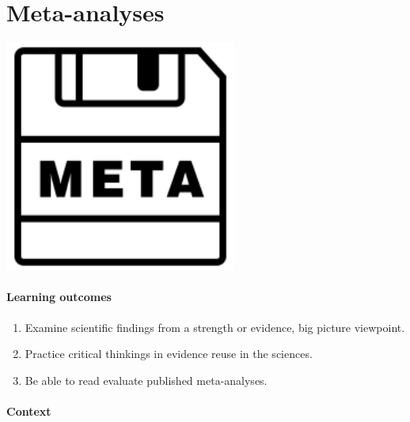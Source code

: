 \documentclass[
]{book}
\providecommand{\tightlist}{%
  \setlength{\itemsep}{0pt}\setlength{\parskip}{0pt}}
\begin{document}
\hypertarget{metas}{%
\chapter{Meta-analyses}\label{metas}}

\includegraphics[width=3in,height=\textheight]{./meta.png}

\hypertarget{learning-outcomes-8}{%
\subsubsection*{Learning outcomes}\label{learning-outcomes-8}}

\begin{enumerate}
\def\labelenumi{\arabic{enumi}.}
\tightlist
\item
  Examine scientific findings from a strength or evidence, big picture viewpoint.
\item
  Practice critical thinkings in evidence reuse in the sciences.\\
\item
  Be able to read evaluate published meta-analyses.
\end{enumerate}

\hypertarget{context-7}{%
\subsubsection*{Context}\label{context-7}}
\end{document}

